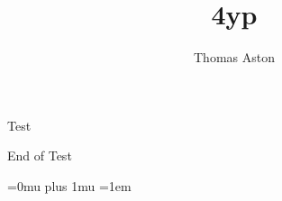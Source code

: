 \documentclass[12pt]{article}%
\title{4yp}
\author{Thomas Aston}
\begin{document}
  \maketitle
 Test
 
 End of Test


  



  \Urlmuskip=0mu plus 1mu
  \emergencystretch=1em
  \printbibliography{}
\end{document}
